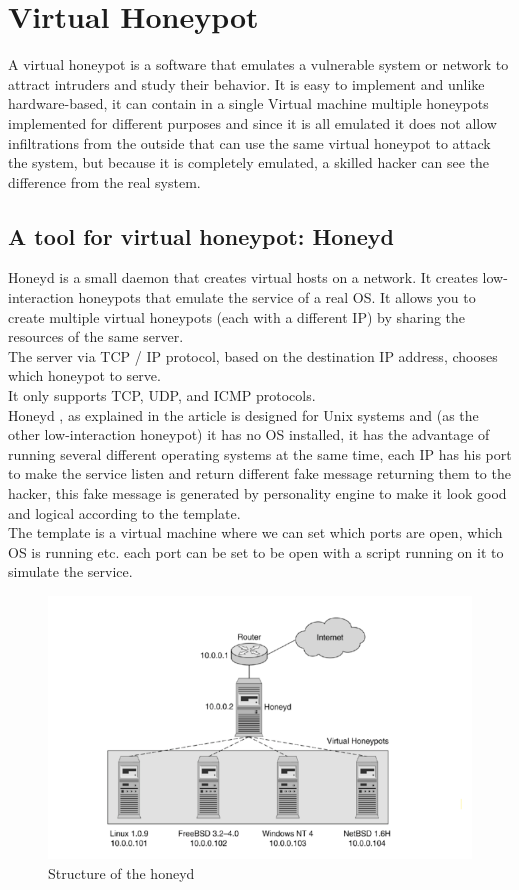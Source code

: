 \section{Virtual Honeypot}
A virtual honeypot is a software that emulates a vulnerable system or network to attract intruders and study their behavior. It is easy to implement and unlike hardware-based, it can contain in a single Virtual machine multiple honeypots implemented for different purposes and since it is all emulated it does not allow infiltrations from the outside that can use the same virtual honeypot to attack the system, but because it is completely emulated, a skilled hacker can see the difference from the real system.
\subsection{A tool for virtual honeypot: Honeyd}
Honeyd is a small daemon that creates virtual hosts on a network. It creates low-interaction honeypots that emulate the service of a real OS.
It allows you to create multiple virtual honeypots (each with a different IP) by sharing the resources of the same server.\\
The server via TCP / IP protocol, based on the destination IP address, chooses which honeypot to serve.\\
It only supports TCP, UDP, and ICMP protocols.\\
Honeyd , as explained in the article \cite{Provos2003HoneydA} is designed for Unix systems and (as the other low-interaction honeypot) it has no OS installed, it has the advantage of running several different operating systems at the same time, each IP has his port to make the service listen and return different fake message returning them to the hacker, this fake message is generated by personality engine to make it look good and logical according to the template.\\
The template is a virtual machine where we can set which ports are open, which OS is running etc. each port can be set to be open with a script running on it to simulate the service.\\
\begin{figure}[h!]
\centering
\includegraphics{images/honeyd1.png}
\caption{Structure of the honeyd}
\label{fig:irradiances}
\end{figure}
